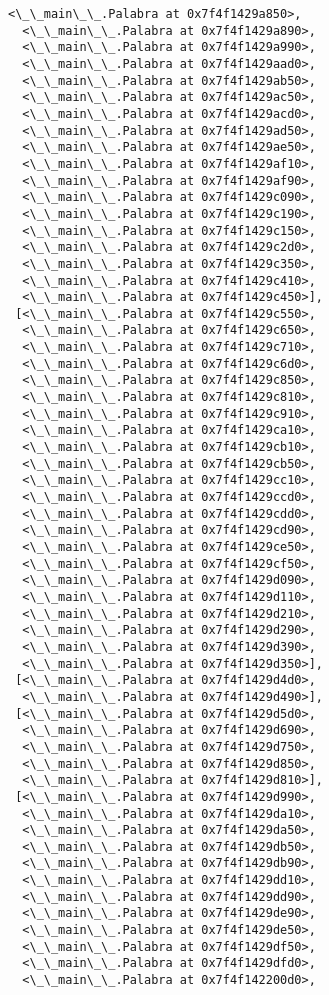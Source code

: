 \documentclass[12pt,a4paper,table]{article}
\begin{document}
\begin{tcolorbox}[breakable, size=fbox, boxrule=.5pt, pad at break*=1mm, opacityfill=0]
\begin{Verbatim}[commandchars=\\\{\}]
  <\_\_main\_\_.Palabra at 0x7f4f1429a850>,
  <\_\_main\_\_.Palabra at 0x7f4f1429a890>,
  <\_\_main\_\_.Palabra at 0x7f4f1429a990>,
  <\_\_main\_\_.Palabra at 0x7f4f1429aad0>,
  <\_\_main\_\_.Palabra at 0x7f4f1429ab50>,
  <\_\_main\_\_.Palabra at 0x7f4f1429ac50>,
  <\_\_main\_\_.Palabra at 0x7f4f1429acd0>,
  <\_\_main\_\_.Palabra at 0x7f4f1429ad50>,
  <\_\_main\_\_.Palabra at 0x7f4f1429ae50>,
  <\_\_main\_\_.Palabra at 0x7f4f1429af10>,
  <\_\_main\_\_.Palabra at 0x7f4f1429af90>,
  <\_\_main\_\_.Palabra at 0x7f4f1429c090>,
  <\_\_main\_\_.Palabra at 0x7f4f1429c190>,
  <\_\_main\_\_.Palabra at 0x7f4f1429c150>,
  <\_\_main\_\_.Palabra at 0x7f4f1429c2d0>,
  <\_\_main\_\_.Palabra at 0x7f4f1429c350>,
  <\_\_main\_\_.Palabra at 0x7f4f1429c410>,
  <\_\_main\_\_.Palabra at 0x7f4f1429c450>],
 [<\_\_main\_\_.Palabra at 0x7f4f1429c550>,
  <\_\_main\_\_.Palabra at 0x7f4f1429c650>,
  <\_\_main\_\_.Palabra at 0x7f4f1429c710>,
  <\_\_main\_\_.Palabra at 0x7f4f1429c6d0>,
  <\_\_main\_\_.Palabra at 0x7f4f1429c850>,
  <\_\_main\_\_.Palabra at 0x7f4f1429c810>,
  <\_\_main\_\_.Palabra at 0x7f4f1429c910>,
  <\_\_main\_\_.Palabra at 0x7f4f1429ca10>,
  <\_\_main\_\_.Palabra at 0x7f4f1429cb10>,
  <\_\_main\_\_.Palabra at 0x7f4f1429cb50>,
  <\_\_main\_\_.Palabra at 0x7f4f1429cc10>,
  <\_\_main\_\_.Palabra at 0x7f4f1429ccd0>,
  <\_\_main\_\_.Palabra at 0x7f4f1429cdd0>,
  <\_\_main\_\_.Palabra at 0x7f4f1429cd90>,
  <\_\_main\_\_.Palabra at 0x7f4f1429ce50>,
  <\_\_main\_\_.Palabra at 0x7f4f1429cf50>,
  <\_\_main\_\_.Palabra at 0x7f4f1429d090>,
  <\_\_main\_\_.Palabra at 0x7f4f1429d110>,
  <\_\_main\_\_.Palabra at 0x7f4f1429d210>,
  <\_\_main\_\_.Palabra at 0x7f4f1429d290>,
  <\_\_main\_\_.Palabra at 0x7f4f1429d390>,
  <\_\_main\_\_.Palabra at 0x7f4f1429d350>],
 [<\_\_main\_\_.Palabra at 0x7f4f1429d4d0>,
  <\_\_main\_\_.Palabra at 0x7f4f1429d490>],
 [<\_\_main\_\_.Palabra at 0x7f4f1429d5d0>,
  <\_\_main\_\_.Palabra at 0x7f4f1429d690>,
  <\_\_main\_\_.Palabra at 0x7f4f1429d750>,
  <\_\_main\_\_.Palabra at 0x7f4f1429d850>,
  <\_\_main\_\_.Palabra at 0x7f4f1429d810>],
 [<\_\_main\_\_.Palabra at 0x7f4f1429d990>,
  <\_\_main\_\_.Palabra at 0x7f4f1429da10>,
  <\_\_main\_\_.Palabra at 0x7f4f1429da50>,
  <\_\_main\_\_.Palabra at 0x7f4f1429db50>,
  <\_\_main\_\_.Palabra at 0x7f4f1429db90>,
  <\_\_main\_\_.Palabra at 0x7f4f1429dd10>,
  <\_\_main\_\_.Palabra at 0x7f4f1429dd90>,
  <\_\_main\_\_.Palabra at 0x7f4f1429de90>,
  <\_\_main\_\_.Palabra at 0x7f4f1429de50>,
  <\_\_main\_\_.Palabra at 0x7f4f1429df50>,
  <\_\_main\_\_.Palabra at 0x7f4f1429dfd0>,
  <\_\_main\_\_.Palabra at 0x7f4f142200d0>,

\end{Verbatim}
\end{tcolorbox}
\end{document}
